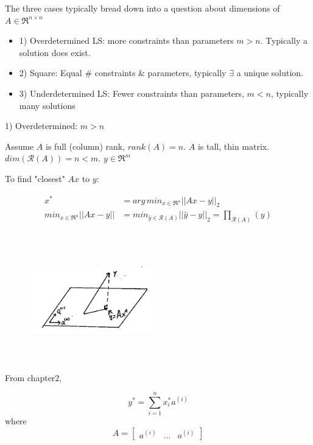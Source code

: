 The three cases typically bread down into a question about dimensions of $A\in \Re^{n\times n}$

\begin{itemize}
	\item 1) Overdetermined LS: more constraints than parameters $m>n$. Typically a solution does exist. 
	
	\item 2) Square: Equal \# constraints \& parameters, typically $\exists$  a unique solution.
	
	\item 3) Underdetermined LS: Fewer constraints than parameters, $m<n$, typically many solutions
\end{itemize}

1) Overdetermined: $m > n$

Assume $A$ is full (column) rank, $rank(A) =n$. $A$ is tall, thin matrix. $dim(\mathcal{R}(A)) = n < m$. $y\in \Re^m$

To find "closest" $Ax$ to $y$:

\begin{align*}
x^* &= arg \, min_{x\in \Re^n}||Ax - y||_2\\
min_{x\in \Re^{n}}||Ax - y|| &= min_{\hat{y}\in \mathcal{R}(A)}||\hat{y} - y||_2 =\prod_{\mathcal{R}(A)}(y)\\
\end{align*}

\begin{figure}
	\centering
	\includegraphics[width=2.1in,height=2.1in]{figures/ch06/figure1.png}
\end{figure}



From chapter2, 

\begin{equation*}
y^* = \sum^n_{i=1}x_i^*a^{(i)}
\end{equation*}
where 
$$ A =   
\left[
\begin{matrix}
a^{(i)} & ... & a^{(i)}
\end{matrix}
\right]
$$

